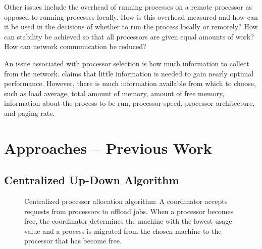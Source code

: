\documentclass{report}
\begin{document}
Other issues include the overhead of running processes on a remote processor
as opposed to running processes locally.  How is this overhead measured
and how can it be used in the decisions of whether to run the process
locally or remotely?  How can stability be achieved so that all processors
are given equal amounts of work?  How can network communication be reduced?

An issue associated with processor selection is how much information to
collect from the network.  \cite{random_probe} claims that little
information is needed to gain nearly optimal performance.  However, there is
much information available from which to choose, such as load average,
total amount of memory, amount of free memory, information about the process
to be run, processor speed, processor architecture, and paging rate.

\section{Approaches -- Previous Work}
\label{prev_work}


\subsection{Centralized Up-Down Algorithm \cite{Mutka}}
\label{up_down}

\begin{figure}
	\caption[Centralized Usage Table Algorithm]{Centralized
	processor allocation algorithm: A coordinator accepts requests from
	processors to offload jobs.  When a processor becomes free, the
	coordinator determines the machine with the lowest usage value and a
	process is migrated from the chosen machine to the processor that
	has become free.}
	\label{fig:up_down}
\end{figure}
\end{document}
